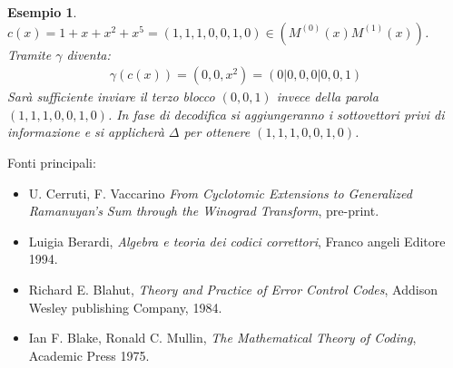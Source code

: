 \documentclass[mathserif]{beamer}
\newtheorem{esempio}{Esempio}
\begin{document}
\begin{frame}
    \begin{esempio}
      $c(x) = 1 + x + x^2 + x^5 = (1,1,1,0,0,1,0)\in (M^{(0)}(x)M^{(1)}(x))$.\\ Tramite $\gamma$ diventa:
      \begin{align*}
	  \gamma(c(x)) = (0,0,x^2) = (0|0,0,0|0,0,1)
      \end{align*}
      Sarà sufficiente inviare il terzo blocco $(0,0,1)$ invece della parola $(1,1,1,0,0,1,0)$. In fase di decodifica si aggiungeranno i sottovettori privi di informazione e si applicherà $\Delta$ per ottenere $(1,1,1,0,0,1,0)$.
    \end{esempio}
\end{frame}

\thispagestyle{empty}
\begin{frame}
Fonti principali:
    \begin{itemize}
      \item U. Cerruti, F. Vaccarino \emph{From Cyclotomic Extensions to Generalized
	    Ramanuyan's Sum through the Winograd Transform}, pre-print.
      \item Luigia Berardi, \emph{Algebra e teoria dei codici correttori}, Franco angeli
	    Editore 1994.
      \item Richard E. Blahut, \emph{Theory and Practice of Error Control Codes},
	    Addison Wesley publishing Company, 1984.
      \item Ian F. Blake, Ronald C. Mullin, \emph{The Mathematical Theory of Coding},
	    Academic Press 1975.

    \end{itemize}
\end{frame}
\end{document}
